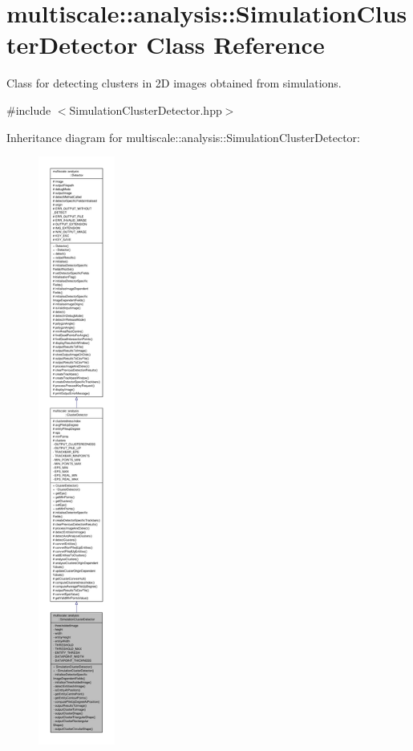 \hypertarget{classmultiscale_1_1analysis_1_1SimulationClusterDetector}{\section{multiscale\-:\-:analysis\-:\-:Simulation\-Cluster\-Detector Class Reference}
\label{classmultiscale_1_1analysis_1_1SimulationClusterDetector}
}


Class for detecting clusters in 2\-D images obtained from simulations.  




{\ttfamily \#include $<$Simulation\-Cluster\-Detector.\-hpp$>$}



Inheritance diagram for multiscale\-:\-:analysis\-:\-:Simulation\-Cluster\-Detector\-:
\nopagebreak
\begin{figure}[H]
\begin{center}
\leavevmode
\includegraphics[height=550pt]{classmultiscale_1_1analysis_1_1SimulationClusterDetector__inherit__graph}
\end{center}
\end{figure}



